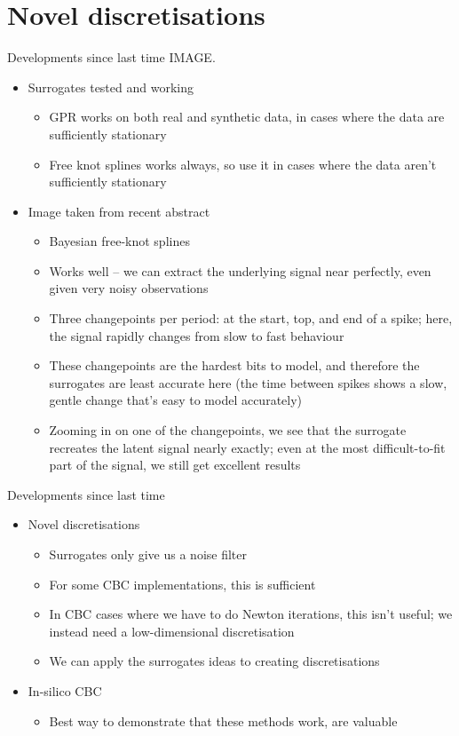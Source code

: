 \documentclass[presentation]{beamer}
\begin{document}
\section{Novel discretisations}
\label{sec:org34ac465}
\begin{frame}[plain,label={sec:orgd8a879e}]{Developments since last time}
IMAGE. 
\begin{itemize}
\item Surrogates tested and working
\begin{itemize}
\item GPR works on both real and synthetic data, in cases where the data are sufficiently stationary
\item Free knot splines works always, so use it in cases where the data aren't sufficiently stationary
\end{itemize}

\item Image taken from recent abstract
\begin{itemize}
\item Bayesian free-knot splines
\item Works well -- we can extract the underlying signal near perfectly, even given very noisy observations
\item Three changepoints per period: at the start, top, and end of a spike; here, the signal rapidly changes from slow to fast behaviour
\item These changepoints are the hardest bits to model, and therefore the surrogates are least accurate here (the time between spikes shows a slow, gentle change that's easy to model accurately)
\item Zooming in on one of the changepoints, we see that the surrogate recreates the latent signal nearly exactly; even at the most difficult-to-fit part of the signal, we still get excellent results
\end{itemize}
\end{itemize}
\end{frame}

\begin{frame}[plain,label={sec:orgac8f0c5}]{Developments since last time}
\begin{itemize}
\item Novel discretisations
\begin{itemize}
\item Surrogates only give us a noise filter
\item For some CBC implementations, this is sufficient
\item In CBC cases where we have to do Newton iterations, this isn't useful; we instead need a low-dimensional discretisation
\item We can apply the surrogates ideas to creating discretisations
\end{itemize}

\item In-silico CBC
\begin{itemize}
\item Best way to demonstrate that these methods work, are valuable
\end{itemize}
\end{itemize}
\end{frame}
\end{document}
